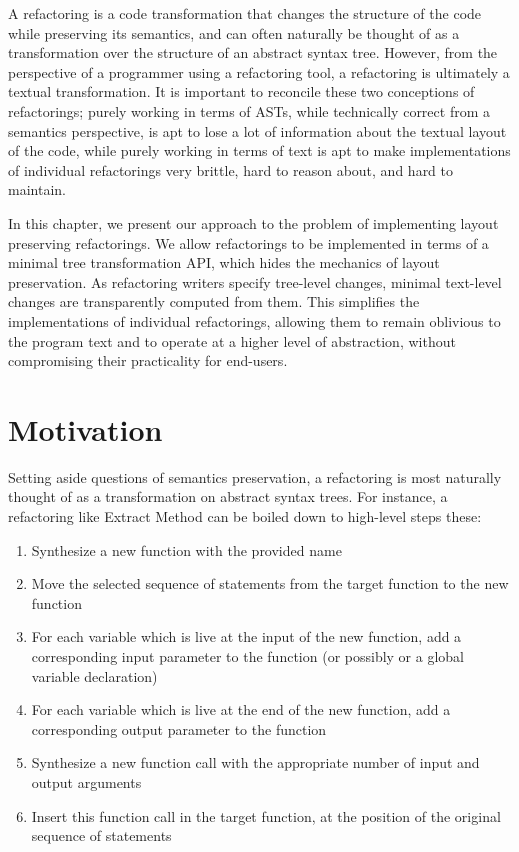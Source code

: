 A refactoring is a code transformation that changes the structure of the code
while preserving its semantics, and can often naturally be thought of as a
transformation over the structure of an abstract syntax tree. However, from
the perspective of a programmer using a refactoring tool, a refactoring is
ultimately a textual transformation. It is important to reconcile these two
conceptions of refactorings; purely working in terms of ASTs, while
technically correct from a semantics perspective, is apt to lose a lot
of information about the textual layout of the code, while purely working
in terms of text is apt to make implementations of individual refactorings
very brittle, hard to reason about, and hard to maintain.

In this chapter, we present our approach to the problem of implementing layout
preserving refactorings. We allow refactorings to be implemented in terms of a
minimal tree transformation API, which hides the mechanics of layout
preservation. As refactoring writers specify tree-level changes, minimal
text-level changes are transparently computed from them. This simplifies the
implementations of individual refactorings, allowing them to remain oblivious
to the program text and to operate at a higher level of abstraction, without
compromising their practicality for end-users.

\section{Motivation}

Setting aside questions of semantics preservation, a refactoring is most
naturally thought of as a transformation on abstract syntax trees. For
instance, a refactoring like Extract Method can be boiled down to high-level
steps these:

\begin{enumerate}
  \item Synthesize a new function with the provided name
  \item Move the selected sequence of statements from the target function to
    the new function
  \item For each variable which is live at the input of the new function, add a
    corresponding input parameter to the function (or possibly or a global
    variable declaration)
  \item For each variable which is live at the end of the new function, add a
    corresponding output parameter to the function
  \item Synthesize a new function call with the appropriate number of input and
    output arguments
  \item Insert this function call in the target function, at the position of
    the original sequence of statements
\end{enumerate}

